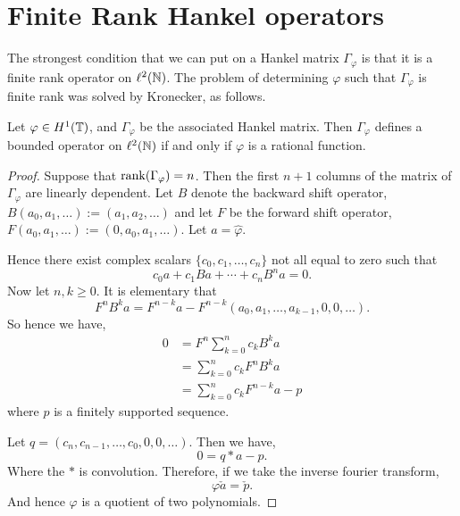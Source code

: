 \section{Finite Rank Hankel operators}
The strongest condition that we can put on a Hankel matrix $\Gamma_\varphi$
is that it is a finite rank operator on $\ell^2(\mathbb{N})$. The problem
of determining $\varphi$ such that $\Gamma_\varphi$ is finite rank
was solved by Kronecker, as follows.
\begin{theorem}
\label{kronecker}
    Let $\varphi \in H^1(\mathbb{T})$, and $\Gamma_\varphi$ be the associated Hankel
    matrix. Then $\Gamma_\varphi$ defines a bounded operator on $\ell^2(\mathbb{N})$
    if and only if $\varphi$ is a rational function.
\end{theorem}
\begin{proof}
    Suppose that $\operatorname{rank}(\Gamma_\varphi) = n$. Then the first $n+1$
    columns of the matrix of $\Gamma_\varphi$ are linearly dependent. Let $B$
    denote the backward shift operator, $B(a_0,a_1,\ldots) := (a_1,a_2,\ldots)$
    and let $F$ be the forward shift operator, $F(a_0,a_1,\ldots) := (0,a_0,a_1,\ldots)$.
    Let $a = \hat{\varphi}$.
    
    Hence there exist complex scalars $\{c_0,c_1,\ldots,c_n\}$ not all
    equal to zero such that
    \begin{equation*}
        c_0a+c_1Ba+\cdots+c_nB^na = 0.
    \end{equation*}
    Now let $n,k \geq 0$. It is elementary that
    \begin{equation*}
        F^n B^k a = F^{n-k}a-F^{n-k}(a_0,a_1,\ldots,a_{k-1},0,0,\ldots).
    \end{equation*}
    So hence we have,
    \begin{align*}
        0 &= F^n\sum_{k=0}^n c_k B^ka \\
          &= \sum_{k=0}^n c_kF^n B^ka\\
          &= \sum_{k=0}^n c_kF^{n-k}a - p
    \end{align*}
    where $p$ is a finitely supported sequence. 
    
    Let $q = (c_n,c_{n-1},\ldots,c_0,0,0,\ldots)$. Then we have,
    \begin{equation*}
        0 = q * a - p.
    \end{equation*}
    Where the $*$ is convolution. Therefore, if we take the inverse fourier transform,
    \begin{equation*}
        \varphi\check{a} = \check{p}.
    \end{equation*}
    And hence $\varphi$ is a quotient of two polynomials.
    

\end{proof}
